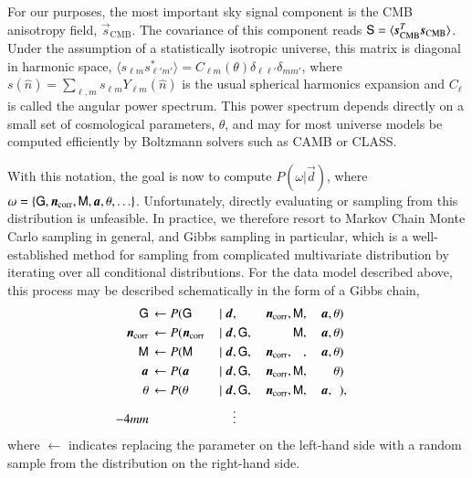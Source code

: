 \documentclass[twocolumn]{../common/aa}
\renewcommand{\d}[0]{\vec{d}}
\renewcommand{\G}[0]{\tens{G}}
\newcommand{\n}[0]{\vec{n}}
\newcommand{\s}[0]{\vec{s}}
\renewcommand{\a}[0]{\vec{a}}
\newcommand{\M}[0]{\tens{M}}
\renewcommand{\S}[0]{\tens{S}}
\newcommand{\data}{\vec d}
\newcommand{\ncorr}{\vec n_\mathrm{corr}}
\begin{document}
For our purposes, the most important sky signal component is the CMB anisotropy field, $\s_{\mathrm{CMB}}$. The covariance of this component reads $\S = \langle \s_{\mathrm{CMB}}^T \s_{\mathrm{CMB}}\rangle$. Under the assumption of a statistically isotropic universe, this matrix is diagonal in harmonic space, $\langle s_{\ell m} s^*_{\ell' m'}\rangle = C_{\ell m}(\theta) \delta_{\ell\ell'}\delta_{mm'}$, where $s(\hat{n}) = \sum_{\ell,m} s_{\ell m} Y_{\ell m}(\hat{n})$ is the usual spherical harmonics expansion and $C_{\ell}$ is called the angular power spectrum. This power spectrum depends directly on a small set of cosmological parameters, $\theta$, and may for most universe models be computed efficiently by Boltzmann solvers such as CAMB or CLASS.

With this notation, the goal is now to compute $P(\omega|\d)$, where $\omega = \{\G, \n_{\mathrm{corr}}, \M, \a, \theta, \ldots\}$. Unfortunately, directly evaluating or sampling from this distribution is unfeasible. In practice, we therefore resort to Markov Chain Monte Carlo sampling in general, and Gibbs sampling in particular, which is a well-established method for sampling from complicated multivariate distribution by iterating over all conditional distributions. For the data model described above, this process may be described schematically in the form of a Gibbs chain, 
  \begin{alignat}{9}
    \label{eq:gain_samp_dist}\G &\,\leftarrow          P(\G&\,               \mid \data, &\,\phantom{\G,} &\,\ncorr,&\,\M, &\,\a, &\,\theta)\\
    \label{eq:ncorr_samp_dist} \ncorr &\,\leftarrow    P(\ncorr&\,        \mid \data, &\,\G, &\,\phantom{\ncorr,}  &\,\M, &\,\a, &\,\theta)\\
    \label{eq:beta_samp}\M &\,\leftarrow                     P(\M &\, \mid \data, &\,\G, &\,\ncorr, &\,\phantom{\M}, &\,\a, &\,\theta)\\
    \a &\,\leftarrow                                   P(\a&\,            \mid \data, &\,\G, &\,\ncorr, &\,\M, &\,\phantom{\a,} &\,\theta)\\
    \theta &\,\leftarrow                             P(\theta &\,         \mid \data, &\,\G, &\,\ncorr, &\,\M, &\,\a,&\,\phantom{\theta})\label{eq:param_samp},\\\vspace*{-4mm}
     &&\vdots                             & & & & & & \nonumber
    \end{alignat}
  where $\leftarrow$ indicates replacing the parameter on the left-hand side with a random sample from the distribution on the right-hand side.
\end{document}
